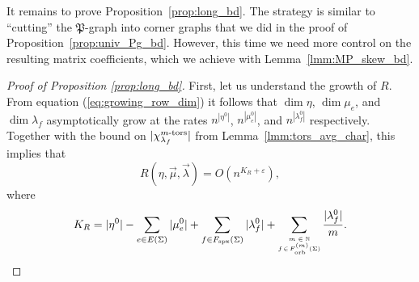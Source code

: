 \documentclass{amsart}
\newcommand{\Fspx}{F_{\textnormal{spx}}}
\newcommand{\Forb}[1][m]{F^{(#1)}_{\textnormal{orb}}}
\newcommand{\iterorb}{{\tiny\begin{matrix}m\in\mathbb{N}\\f\!\in\!\Forb(\Sigma)\end{matrix}}}
\newcommand{\tn}{\textnormal}
\begin{document}
It remains to prove Proposition~\ref{prop:long_bd}. The strategy is similar to ``cutting'' the $\mathfrak{P}$-graph into corner graphs that we did in the proof of Proposition~\ref{prop:univ_Pg_bd}. However, this time we need more control on the resulting matrix coefficients, which we achieve with Lemma~\ref{lmm:MP_skew_bd}.
\begin{proof}[Proof of Proposition \ref{prop:long_bd}]
First, let us understand the growth of $R$. From equation (\ref{eq:growing_row_dim}) it follows that $\dim\eta$, $\dim\mu_e$, and $\dim\lambda_f$ asymptotically grow at the rates $n^{|\eta^0|}$, $n^{|\mu^0_e|}$, and $n^{|\lambda^0_f|}$ respectively. Together with the bound on $|\chi^{m\tn{-tors}}_{\lambda_f}|$ from Lemma~\ref{lmm:tors_avg_char}, this implies that
\begin{equation}\label{eq:B_powerlaw}
R(\eta,\vec\mu,\vec\lambda)=O(n^{K_R+\varepsilon}),
\end{equation}
where
\begin{equation}\label{eq:B_exponent}
K_R=|\eta^0|-\sum_{e\in E(\Sigma)}|\mu^0_e|+\sum_{f\in\Fspx(\Sigma)}|\lambda^0_f|+\sum_\iterorb\frac{|\lambda^0_f|}{m}.
\end{equation}


\end{proof}
\end{document}
